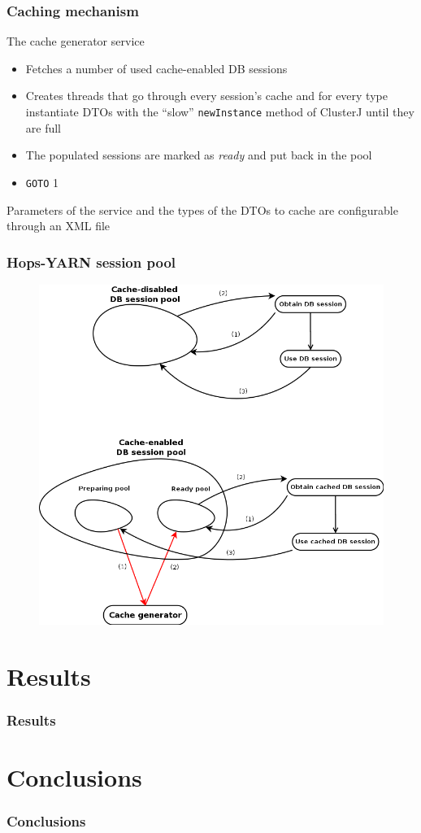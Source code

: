 \documentclass{beamer}
\begin{document}
\begin{frame}
\frametitle{Caching mechanism}

The cache generator service
\begin{itemize}
\item Fetches a number of used cache-enabled DB sessions

\item Creates threads that go through every session's cache and for
  every type instantiate DTOs with the ``slow''
  \texttt{newInstance} method of ClusterJ until they are full

\item The populated sessions are marked as \emph{ready} and put back
  in the pool

\item \texttt{GOTO} 1
\end{itemize}

Parameters of the service and the types of the DTOs to cache are
  configurable through an XML file

\end{frame}


\begin{frame}
\frametitle{Hops-YARN session pool}

\begin{figure}
\centering
\includegraphics[scale=0.2]{resources/db_session_pools.png}
\end{figure}
\end{frame}

\section{Results}
\begin{frame}
\frametitle{Results}
\end{frame}

\section{Conclusions}
\begin{frame}
\frametitle{Conclusions}
\end{frame}
\end{document}
